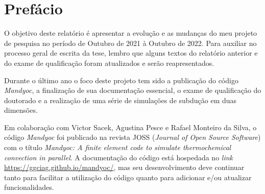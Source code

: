 \chapter{Prefácio}
\label{prefacio}

O objetivo deste relatório é apresentar a evolução e as mudanças do meu projeto de pesquisa no período de Outubro de 2021 à Outubro de 2022. Para auxiliar no processo geral de escrita da tese, lembro que alguns textos do relatório anterior e do exame de qualificação foram atualizados e serão reapresentados. 





Durante o último ano o foco deste projeto tem sido a publicação do código \textit{Mandyoc}, a finalização de sua documentação essencial, o exame de qualificação do doutorado e a realização de uma série de simulações de subdução em duas dimensões. 

Em colaboração com Victor Sacek, Agustina Pesce e Rafael Monteiro da Silva, o código \textit{Mandyoc} foi publicado na revista JOSS (\textit{Journal of Open Source Software}) com o título \textit{Mandyoc: A finite element code to simulate thermochemical convection in parallel}. A documentação do código está hospedada no \textit{link} \url{https://ggciag.github.io/mandyoc/}, mas seu desenvolvimento deve continuar tanto para facilitar a utilização do código quanto para adicionar e/ou atualizar funcionalidades.

